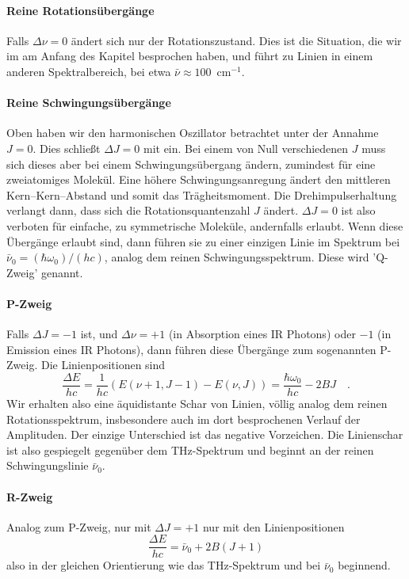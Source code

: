 \paragraph{Reine Rotationsübergänge} Falls $\Delta \nu = 0$ ändert sich nur der Rotationszustand. Dies ist die Situation, die wir im am Anfang des Kapitel besprochen haben, und führt zu Linien  in einem anderen Spektralbereich, bei etwa $\bar{\nu} \approx 100$~cm$^{-1}$.

\paragraph{Reine Schwingungsübergänge} Oben haben wir den  harmonischen Oszillator betrachtet unter der Annahme $J=0$. Dies schließt $\Delta J = 0$ mit ein. Bei einem von Null verschiedenen $J$ muss sich dieses aber bei einem Schwingungsübergang ändern, zumindest für eine zweiatomiges Molekül. Eine höhere Schwingungsanregung ändert den mittleren Kern--Kern--Abstand und somit das Trägheitsmoment. Die Drehimpulserhaltung verlangt dann, dass sich die Rotationsquantenzahl $J$ ändert. $\Delta J = 0$ ist also verboten für einfache, zu symmetrische Moleküle, andernfalls erlaubt. Wenn diese Übergänge erlaubt sind, dann führen sie zu einer einzigen Linie im Spektrum bei $ \bar{\nu}_0 = (\hbar \omega_0)/(h c) $, analog dem reinen Schwingungsspektrum. Diese wird 'Q-Zweig' genannt. 

\paragraph{P-Zweig} Falls $\Delta J = -1$ ist, und $\Delta \nu = +1$ (in Absorption eines IR Photons) oder $-1$ (in Emission eines IR Photons), dann führen diese Übergänge zum sogenannten P-Zweig. Die Linienpositionen sind
\begin{equation}
 \frac{\Delta E}{h c} = \frac{1}{h c} \left( E(\nu +1, J -1) - E(\nu, J) \right) = \frac{\hbar \omega_0}{h c}   - 2 B J \quad .
\end{equation}
Wir erhalten also eine äquidistante Schar von Linien, völlig analog dem reinen Rotationsspektrum, insbesondere auch im dort besprochenen Verlauf der Amplituden. Der einzige Unterschied ist das negative Vorzeichen. Die Linienschar ist also gespiegelt gegenüber dem THz-Spektrum und beginnt an der reinen Schwingungslinie $\bar{\nu}_0 $.

\paragraph{R-Zweig} Analog zum P-Zweig, nur mit  $\Delta J = +1$ nur mit den Linienpositionen
\begin{equation}
 \frac{\Delta E}{h c} =  \bar{\nu}_0   + 2 B ( J +1)
\end{equation}
also in der gleichen Orientierung wie das THz-Spektrum und bei $\bar{\nu}_0 $ beginnend.

